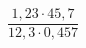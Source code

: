 \begin{ex}
	\begin{condition}
		\( \dfrac{1,23\cdot45,7}{12,3\cdot0,457} \)
	\end{condition}
\end{ex}
